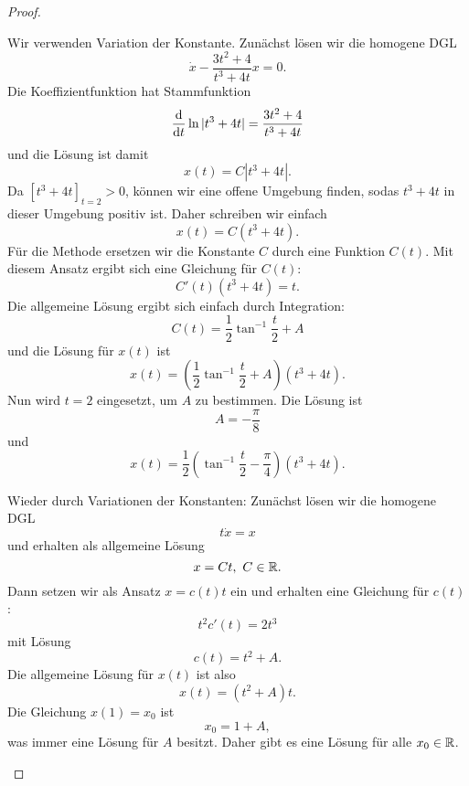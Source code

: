 \begin{proof}
	\begin{parts}
	\item Wir verwenden Variation der Konstante. Zunächst lösen wir die homogene DGL
		\[
			\dot{x}-\frac{3t^2+4}{t^3+4t}x=0
		.\] 
		Die Koeffizientfunktion hat Stammfunktion
		\[
			\dv{t} \ln |t^3 + 4t|=\frac{3t^2+4}{t^3+4t}
		\]
		und die Lösung ist damit
		\[
			x(t) = C|t^3 + 4t|
		.\] 
		Da $[t^3+4t]_{t=2}>0$, können wir eine offene Umgebung finden, sodas $t^3+4t$ in dieser Umgebung positiv ist. Daher schreiben wir einfach
		\[
		x(t)=C(t^3+4t)
		.\] 
		Für die Methode ersetzen wir die Konstante $C$ durch eine Funktion $C(t)$. Mit diesem Ansatz ergibt sich eine Gleichung für $C(t)$: 
		\[
		C'(t)(t^3+4t)=t
		.\] 
		Die allgemeine Lösung ergibt sich einfach durch Integration:
		\[
			C(t)=\frac{1}{2}\tan^{-1}\frac{t}{2}+A
		\] 
		und die Lösung für $x(t)$ ist
		\[
			x(t)=\left( \frac{1}{2}\tan^{-1}\frac{t}{2}+A \right)(t^3+4t)
		.\] 
		Nun wird $t=2$ eingesetzt, um $A$ zu bestimmen. Die Lösung ist
		\[
		A=-\frac{\pi}{8}
	\]
	und
	\[
		x(t)=\frac{1}{2}\left( \tan^{-1}\frac{t}{2}-\frac{\pi}{4} \right)(t^3+4t)
	.\] 
\item Wieder durch Variationen der Konstanten: Zunächst lösen wir die homogene DGL
	\[
		t\dot{x}=x
	\]
	und erhalten als allgemeine Lösung
	\[
	x=Ct,~C\in \mathbb{R}
	.\] 
	Dann setzen wir als Ansatz $x=c(t)t$ ein und erhalten eine Gleichung für $c(t)$:
	\[
t^2 c'(t)=2t^3
	\] 
	mit Lösung
	\[
	c(t) = t^2+A
	.\] 
	Die allgemeine Lösung für $x(t)$ ist also
	\[
	x(t) = \left(t^2+A \right)t
	.\] 
	Die Gleichung $x(1)=x_0$ ist
	\[
	x_0=1+A
,\]
was immer eine Lösung für $A$ besitzt. Daher gibt es eine Lösung für alle $x_0\in \mathbb{R}$.\qedhere
	\end{parts}
\end{proof}
